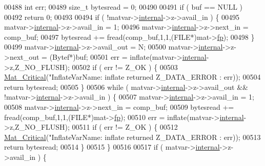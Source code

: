 \begin{DoxyCode}
{{{{{{{{{{{{{{00488     \textcolor{keywordtype}{int}    err;
00489     \textcolor{keywordtype}{size\_t} bytesread = 0;
00490 
00491     \textcolor{keywordflow}{if} ( buf == NULL )
00492         \textcolor{keywordflow}{return} 0;
00493 
00494     \textcolor{keywordflow}{if} ( !matvar->\hyperlink{group___m_a_t_a6e97e3ed9f40c49322c18561c2a94e92}{internal}->z->avail\_in ) \{
00495         matvar->\hyperlink{group___m_a_t_a6e97e3ed9f40c49322c18561c2a94e92}{internal}->z->avail\_in = 1;
00496         matvar->\hyperlink{group___m_a_t_a6e97e3ed9f40c49322c18561c2a94e92}{internal}->z->next\_in = comp\_buf;
00497         bytesread += fread(comp\_buf,1,1,(FILE*)mat->\hyperlink{struct__mat__t_a85f562e407ca9ad4d2a6e14f839432b7}{fp});
00498     \}
00499     matvar->\hyperlink{group___m_a_t_a6e97e3ed9f40c49322c18561c2a94e92}{internal}->z->avail\_out = N;
00500     matvar->\hyperlink{group___m_a_t_a6e97e3ed9f40c49322c18561c2a94e92}{internal}->z->next\_out = (Bytef*)buf;
00501     err = inflate(matvar->\hyperlink{group___m_a_t_a6e97e3ed9f40c49322c18561c2a94e92}{internal}->z,Z\_NO\_FLUSH);
00502     \textcolor{keywordflow}{if} ( err != Z\_OK ) \{
00503         \hyperlink{group__mat__util_gaf51f2bfbb5580f575e4dd79757e2b80c}{Mat\_Critical}(\textcolor{stringliteral}{"InflateVarName: inflate returned %
      Z\_DATA\_ERROR : err));
00504         \textcolor{keywordflow}{return} bytesread;
00505     \}
00506     \textcolor{keywordflow}{while} ( matvar->\hyperlink{group___m_a_t_a6e97e3ed9f40c49322c18561c2a94e92}{internal}->z->avail\_out && !matvar->\hyperlink{group___m_a_t_a6e97e3ed9f40c49322c18561c2a94e92}{internal}->z->avail\_in ) \{
00507         matvar->\hyperlink{group___m_a_t_a6e97e3ed9f40c49322c18561c2a94e92}{internal}->z->avail\_in = 1;
00508         matvar->\hyperlink{group___m_a_t_a6e97e3ed9f40c49322c18561c2a94e92}{internal}->z->next\_in = comp\_buf;
00509         bytesread += fread(comp\_buf,1,1,(FILE*)mat->\hyperlink{struct__mat__t_a85f562e407ca9ad4d2a6e14f839432b7}{fp});
00510         err = inflate(matvar->\hyperlink{group___m_a_t_a6e97e3ed9f40c49322c18561c2a94e92}{internal}->z,Z\_NO\_FLUSH);
00511         \textcolor{keywordflow}{if} ( err != Z\_OK ) \{
00512             \hyperlink{group__mat__util_gaf51f2bfbb5580f575e4dd79757e2b80c}{Mat\_Critical}(\textcolor{stringliteral}{"InflateVarName: inflate returned %
      Z\_DATA\_ERROR : err));
00513             \textcolor{keywordflow}{return} bytesread;
00514         \}
00515     \}
00516 
00517     \textcolor{keywordflow}{if} ( matvar->\hyperlink{group___m_a_t_a6e97e3ed9f40c49322c18561c2a94e92}{internal}->z->avail\_in ) \{
}}}}}}}}}}}}}}}}
\end{DoxyCode}
